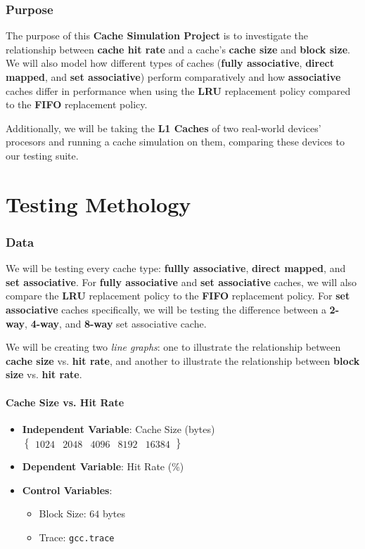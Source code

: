 \documentclass[12pt, letterpaper]{article}
\begin{document}
\section*{Purpose}

\bigskip
The purpose of this \textbf{Cache Simulation Project} is to investigate the relationship between \textbf{cache hit rate} and a cache's \textbf{cache size} and \textbf{block size}. We will also model how different types of caches (\textbf{fully associative}, \textbf{direct mapped}, and \textbf{set associative}) perform comparatively and how \textbf{associative} caches differ in performance when using the \textbf{LRU} replacement policy compared to the \textbf{FIFO} replacement policy.
 
\bigskip

Additionally, we will be taking the \textbf{L1 Caches} of two real-world devices' procesors and running a cache simulation on them, comparing these devices to our testing suite.

\part{Testing Methology}

\section*{Data}

We will be testing every cache type: \textbf{fullly associative}, \textbf{direct mapped}, and \textbf{set associative}. For \textbf{fully associative} and \textbf{set associative} caches, we will also compare the \textbf{LRU} replacement policy to the \textbf{FIFO} replacement policy. For \textbf{set associative} caches specifically, we will be testing the difference between a \textbf{2-way}, \textbf{4-way}, and \textbf{8-way} set associative cache.

\bigskip
We will be creating two \textit{line graphs}: one to illustrate the relationship between \textbf{cache size} vs. \textbf{hit rate}, and another to illustrate the relationship between \textbf{block size} vs. \textbf{hit rate}.

\subsection*{Cache Size vs. Hit Rate}

\begin{itemize}
    \item \textbf{Independent Variable}: Cache Size (bytes) $ \begin{Bmatrix}
            1024 & 2048 & 4096 & 8192 & 16384
    \end{Bmatrix} $
    \item \textbf{Dependent Variable}: Hit Rate (\%)
    \item \textbf{Control Variables}:
        \begin{itemize}
            \item Block Size: $ 64 $ bytes
            \item Trace: \texttt{gcc.trace}
        \end{itemize}
\end{itemize}
\end{document}
